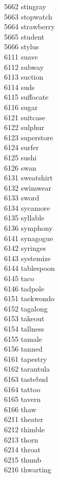 5662 stingray \\
5663 stopwatch \\
5664 strawberry \\
5665 student \\
5666 stylus \\
6111 suave \\
6112 subway \\
6113 suction \\
6114 suds \\
6115 suffocate \\
6116 sugar \\
6121 suitcase \\
6122 sulphur \\
6123 superstore \\
6124 surfer \\
6125 sushi \\
6126 swan \\
6131 sweatshirt \\
6132 swimwear \\
6133 sword \\
6134 sycamore \\
6135 syllable \\
6136 symphony \\
6141 synagogue \\
6142 syringes \\
6143 systemize \\
6144 tablespoon \\
6145 taco \\
6146 tadpole \\
6151 taekwondo \\
6152 tagalong \\
6153 takeout \\
6154 tallness \\
6155 tamale \\
6156 tanned \\
6161 tapestry \\
6162 tarantula \\
6163 tastebud \\
6164 tattoo \\
6165 tavern \\
6166 thaw \\
6211 theater \\
6212 thimble \\
6213 thorn \\
6214 throat \\
6215 thumb \\
6216 thwarting \\
